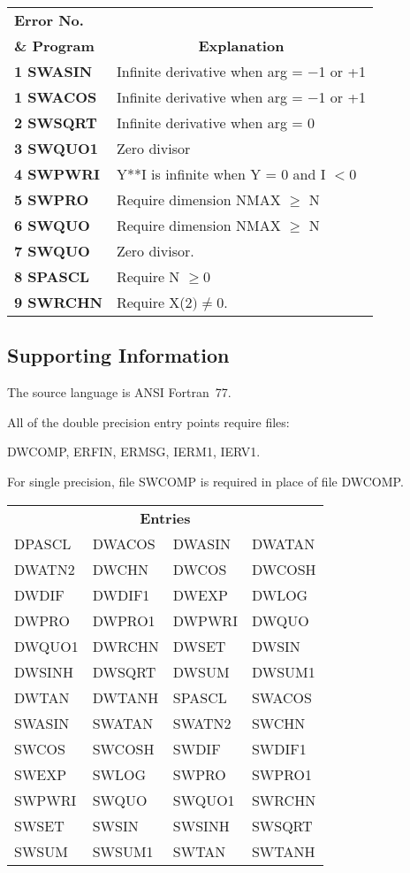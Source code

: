 \documentclass[twoside]{MATH77}
\begin{document}
\begin{tabular}{@{}l@{\ \ }l}
\bf Error No.\\
\bf \& Program & \multicolumn{1}{c}{\bf Explanation}\\
\bf 1 SWASIN & Infinite derivative when arg = $-$1 or +1\\
\bf 1 SWACOS & Infinite derivative when arg = $-$1 or +1\\
\bf 2 SWSQRT & Infinite derivative when arg = 0\\
\bf 3 SWQUO1 & Zero divisor\\
\bf 4 SWPWRI & Y**I is infinite when Y = 0 and I $< 0$\\
\bf 5 SWPRO & Require dimension NMAX $\geq $ N\\
\bf 6 SWQUO & Require dimension NMAX $\geq $ N\\
\bf 7 SWQUO & Zero divisor.\\
\bf 8 SPASCL & Require N $\geq 0$\\
\bf 9 SWRCHN & Require X($2) \neq 0.$
\end{tabular}

\subsection{Supporting Information}

The source language is ANSI Fortran~77.

All of the double precision entry points require files:

DWCOMP, ERFIN, ERMSG, IERM1, IERV1.

For single precision, file SWCOMP is required in place of file DWCOMP.
\vspace{-5pt}
\begin{center}
\begin{tabular}{llll}
\multicolumn{4}{c}{\bf Entries} \\
DPASCL & DWACOS & DWASIN & DWATAN\\
DWATN2 & DWCHN & DWCOS & DWCOSH\\
DWDIF & DWDIF1 & DWEXP & DWLOG\\
DWPRO & DWPRO1 & DWPWRI & DWQUO\\
DWQUO1 & DWRCHN & DWSET & DWSIN\\
DWSINH & DWSQRT & DWSUM & DWSUM1\\
DWTAN & DWTANH & SPASCL & SWACOS\\
SWASIN & SWATAN & SWATN2 & SWCHN\\
SWCOS & SWCOSH & SWDIF & SWDIF1\\
SWEXP & SWLOG & SWPRO & SWPRO1\\
SWPWRI & SWQUO & SWQUO1 & SWRCHN\\
SWSET & SWSIN & SWSINH & SWSQRT\\
SWSUM & SWSUM1 & SWTAN & SWTANH\\
\end{tabular}
\end{center}
\end{document}
